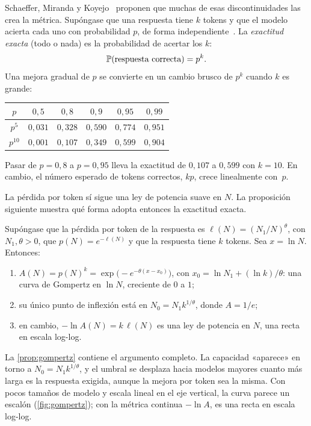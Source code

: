 Schaeffer, Miranda y Koyejo~\cite{schaeffer} proponen que muchas de esas discontinuidades las crea la métrica. Supóngase que una respuesta tiene $k$ tokens y que el modelo acierta cada uno con probabilidad $p$, de forma independiente~\cite[§1.5]{bt}. La \emph{exactitud exacta} (todo o nada) es la probabilidad de acertar los $k$:
\[
\mathbb{P}(\text{respuesta correcta})=p^{k}.
\]
Una mejora gradual de $p$ se convierte en un cambio brusco de $p^{k}$ cuando $k$ es grande:
\begin{center}\small
\begin{tabular}{@{}cccccc@{}}
\toprule
$p$ & $0{,}5$ & $0{,}8$ & $0{,}9$ & $0{,}95$ & $0{,}99$ \\
\midrule
$p^{5}$ & $0{,}031$ & $0{,}328$ & $0{,}590$ & $0{,}774$ & $0{,}951$ \\
$p^{10}$ & $0{,}001$ & $0{,}107$ & $0{,}349$ & $0{,}599$ & $0{,}904$ \\
\bottomrule
\end{tabular}
\end{center}
Pasar de $p=0{,}8$ a $p=0{,}95$ lleva la exactitud de $0{,}107$ a $0{,}599$ con $k=10$. En cambio, el número esperado de tokens correctos, $kp$, crece linealmente con~$p$.

La pérdida por token sí sigue una ley de potencia suave en $N$. La proposición siguiente muestra qué forma adopta entonces la exactitud exacta.

\begin{proposicion}\label{prop:gompertz}
Supóngase que la pérdida por token de la respuesta es $\ell(N)=(N_1/N)^{\theta}$, con $N_1,\theta>0$, que $p(N)=e^{-\ell(N)}$ y que la respuesta tiene $k$ tokens. Sea $x=\ln N$. Entonces:
\begin{enumerate}
  \item $A(N)=p(N)^{k}=\exp\bigl(-e^{-\theta(x-x_0)}\bigr)$, con $x_0=\ln N_1+(\ln k)/\theta$: una curva de Gompertz en $\ln N$, creciente de $0$ a $1$;
  \item su único punto de inflexión está en $N_0=N_1k^{1/\theta}$, donde $A=1/e$;
  \item en cambio, $-\ln A(N)=k\,\ell(N)$ es una ley de potencia en $N$, una recta en escala log-log.
\end{enumerate}
\end{proposicion}

La \cref{prop:gompertz} contiene el argumento completo. La capacidad «aparece» en torno a $N_0=N_1k^{1/\theta}$, y el umbral se desplaza hacia modelos mayores cuanto más larga es la respuesta exigida, aunque la mejora por token sea la misma. Con pocos tamaños de modelo y escala lineal en el eje vertical, la curva parece un escalón (\cref{fig:gompertz}); con la métrica continua $-\ln A$, es una recta en escala log-log.

